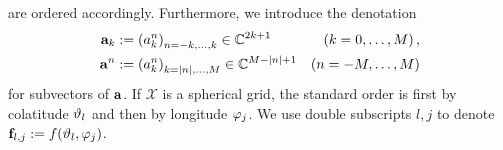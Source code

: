 are ordered accordingly. 
Furthermore, we introduce the denotation
\begin{align*}
    \mathbf{a}_{k} & := \left(a_{k}^{n}\right)_{n=-k,\ldots,k} \in \mathbb{C}^{2k+1} & \left(k=0,\ldots,M\right),\\
    \mathbf{a}^{n} & := \left(a_{k}^{n}\right)_{k=\left\vert n\right\vert,\ldots,M} \in \mathbb{C}^{M-\left\vert n\right\vert+1} & \left(n=-M,\ldots,M\right)
\end{align*} 
for subvectors of $\mathbf{a}$. If $\mathcal{X}$ is a spherical grid, the standard order is first by colatitude $\vartheta_{l}$ and then by longitude $\varphi_{j}$. 
We use double subscripts $l,j$ to denote $\mathbf{f}_{l,j} := f{\hspace{-0.4ex}}\left(\vartheta_{l},\varphi_{j}\right)$.

